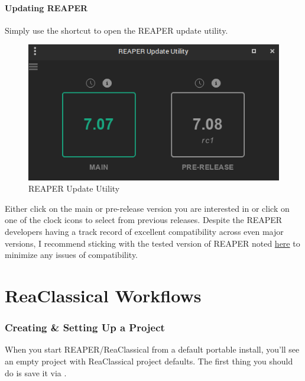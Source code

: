 \documentclass[10pt,american]{article}
\begin{document}
\subsection{Updating REAPER}

Simply use the shortcut  to open the REAPER update utility.

\begin{figure}
\begin{centering}
\includegraphics[scale=0.5]{user_guide_images/reaper_update_utility}
\par\end{centering}
\caption{REAPER Update Utility}

\end{figure}

Either click on the main or pre-release version you are interested in or click
on one of the clock icons to select from previous releases. Despite the REAPER
developers having a track record of excellent compatibility across even major
versions, I recommend sticking with the tested version of REAPER noted
\href{https://raw.githubusercontent.com/chmaha/ReaClassical/main/tested_reaper_ver.txt}{here}
to minimize any issues of compatibility.

\pagebreak{}

\part{ReaClassical Workflows}

\section{Creating \& Setting Up a Project}

When you start REAPER/ReaClassical from a default portable install, you'll see
an empty project with ReaClassical project defaults. The first thing you should
do is save it via .
\end{document}
